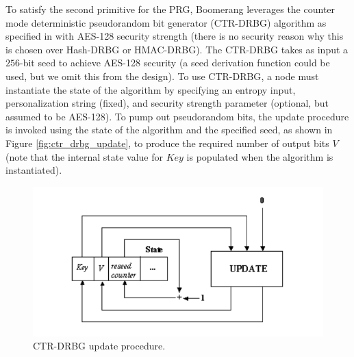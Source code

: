 To satisfy the second primitive for the PRG, Boomerang leverages the counter mode deterministic pseudorandom bit generator ({\sf CTR-DRBG}) algorithm as specified in \cite{nist-prng} with AES-128 security strength (there is no security reason why this is chosen over {\sf Hash-DRBG} or {\sf HMAC-DRBG}). The {\sf CTR-DRBG} takes as input a $256$-bit seed to achieve AES-128 security (a seed derivation function could be used, but we omit this from the design). To use {\sf CTR-DRBG}, a node must instantiate the state of the algorithm by specifying an entropy input, personalization string (fixed), and security strength parameter (optional, but assumed to be AES-128). To pump out pseudorandom bits, the update procedure is invoked using the state of the algorithm and the specified seed, as shown in Figure \ref{fig:ctr_drbg_update}, to produce the required number of output bits $V$ (note that the internal state value for $Key$ is populated when the algorithm is instantiated). 

\begin{figure}[ht!]
\begin{center}
\includegraphics[scale=0.35]{./images/ctr_drbg_update.png}
\caption{{\sf CTR-DRBG} update procedure.}
\label{fig:boomerang_message}
\end{center}
\end{figure}




